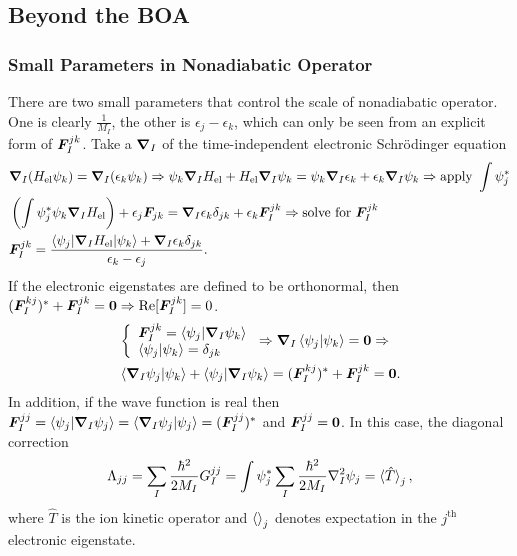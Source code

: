 \subsection{Beyond the BOA}

\subsubsection{Small Parameters in Nonadiabatic Operator}
There are two small parameters that control the scale of nonadiabatic operator. One is clearly $\frac{1}{M_I}$, the other is $\epsilon_j-\epsilon_k$, which can only be seen from an explicit form of $\boldsymbol{F}_I^{jk}$. Take a $\boldsymbol{\nabla}_I$ of the time-independent electronic Schr\"odinger equation
\begin{align}
&\boldsymbol{\nabla}_I(H_{\text{el}}\psi_k) = \boldsymbol{\nabla}_I(\epsilon_k\psi_k ) \Rightarrow \psi_k\boldsymbol{\nabla}_IH_{\text{el}} + H_{\text{el}}\boldsymbol{\nabla}_I\psi_k = \psi_k\boldsymbol{\nabla}_I\epsilon_k + \epsilon_k\boldsymbol{\nabla}_I\psi_k \Rightarrow \nonumber \text{apply }\int\psi_j^* \\ &\left(\int \psi_j^*\psi_k\boldsymbol{\nabla}_IH_{\text{el}}\right) + \epsilon_j \boldsymbol{F}_{jk} = \boldsymbol{\nabla}_I\epsilon_k \delta_{jk}+\epsilon_k\boldsymbol{F}_I^{jk} \Rightarrow \nonumber \text{solve for }\boldsymbol{F}_I^{jk} \\
&\boldsymbol{F}_I^{jk} = \dfrac{\braket{\psi_j|\boldsymbol{\nabla}_IH_{\text{el}}|\psi_k}+\boldsymbol{\nabla}_I\epsilon_k\delta_{jk}}{\epsilon_k-\epsilon_j}.
\end{align}
If the electronic eigenstates are defined to be orthonormal, then $(\boldsymbol{F}_I^{kj})^*+\boldsymbol{F}_I^{jk}=\boldsymbol{0} \Rightarrow \text{Re}[\boldsymbol{F}_I^{jk}]=0$. 
\begin{align}
&\left\{\begin{array}{l}
\boldsymbol{F}^{jk}_I = \braket{\psi_j|\boldsymbol{\nabla}_I\psi_k} \\
\braket{\psi_j|\psi_k} = \delta_{jk}
\end{array}\right. \Rightarrow \boldsymbol{\nabla}_I \braket{\psi_j|\psi_k} = \boldsymbol{0} \nonumber \Rightarrow \\
& \braket{\boldsymbol{\nabla}_I\psi_j|\psi_k} + \braket{\psi_j|\boldsymbol{\nabla}_I\psi_k}   = (\boldsymbol{F}_I^{kj})^*+\boldsymbol{F}_I^{jk} = \boldsymbol{0}.
\end{align}
In addition, if the wave function is real then $\boldsymbol{F}_I^{jj}=\braket{\psi_j|\boldsymbol{\nabla}_I\psi_j} = \braket{\boldsymbol{\nabla}_I\psi_j|\psi_j} = (\boldsymbol{F}_I^{jj})^*$ and $\boldsymbol{F}_I^{jj}=\boldsymbol{0}$. In this case, the diagonal correction
\begin{align}
\Lambda_{jj} = \sum_I \frac{\hbar^2}{2M_I}G_I^{jj} = \int \psi_j^* \sum_I \frac{\hbar^2}{2M_I} \nabla^2_I\psi_j = \braket{\hat{T}}_j,
\end{align}
where $\hat{T}$ is the ion kinetic operator and $\braket{}_j$ denotes expectation in the $j^{\text{th}}$ electronic eigenstate.


